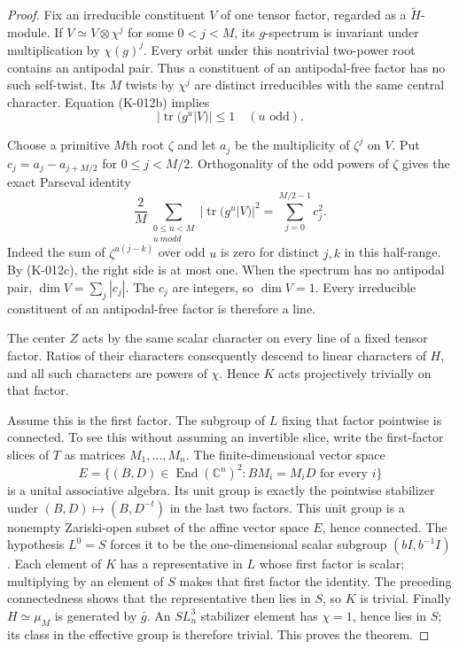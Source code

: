 \begin{proof}
Fix an irreducible constituent $V$ of one tensor factor, regarded as a
$\widetilde H$-module.  If $V\simeq V\otimes\chi^j$ for some
$0<j<M$, its $g$-spectrum is invariant under multiplication by
$\chi(g)^j$.  Every orbit under this nontrivial two-power root contains
an antipodal pair.  Thus a constituent of an antipodal-free factor has
no such self-twist.  Its $M$ twists by $\chi^j$ are distinct irreducibles
with the same central character.  Equation (K-012b) implies
\[
                         |\operatorname{tr}(g^u|V)|\le1
                         \quad(u\text{ odd}).               \tag{K-012c}
\]

Choose a primitive $M$th root $\zeta$ and let $a_j$ be the multiplicity
of $\zeta^j$ on $V$.  Put $c_j=a_j-a_{j+M/2}$ for $0\le j<M/2$.
Orthogonality of the odd powers of $\zeta$ gives the exact Parseval
identity
\[
 \frac{2}{M}\sum_{\substack{0\le u<M\\u\ {
m odd}}}
       |\operatorname{tr}(g^u|V)|^2
       =\sum_{j=0}^{M/2-1}c_j^2.                            \tag{K-012d}
\]
Indeed the sum of $\zeta^{u(j-k)}$ over odd $u$ is zero for distinct
$j,k$ in this half-range.  By (K-012c), the right side is at most one.
When the spectrum has no antipodal pair,
$\dim V=\sum_j|c_j|$.  The $c_j$ are integers, so $\dim V=1$.
Every irreducible constituent of an antipodal-free factor is therefore
a line.

The center $Z$ acts by the same scalar character on every line of a
fixed tensor factor.  Ratios of their characters consequently descend
to linear characters of $H$, and all such characters are powers of
$\chi$.  Hence $K$ acts projectively trivially on that factor.

Assume this is the first factor.  The subgroup of $L$ fixing that
factor pointwise is connected.  To see this without assuming an
invertible slice, write the first-factor slices of $T$ as matrices
$M_1,\ldots,M_n$.  The finite-dimensional vector space
\[
 E=\{(B,D)\in\operatorname{End}(\mathbb C^n)^2:
                       BM_i=M_iD\text{ for every }i\}
\]
is a unital associative algebra.  Its unit group is exactly the
pointwise stabilizer under $(B,D)\mapsto(B,D^{-t})$ in the last two
factors.  This unit group is a nonempty Zariski-open subset of the
affine vector space $E$, hence connected.  The hypothesis $L^0=S$
forces it to be the one-dimensional scalar subgroup
$(bI,b^{-1}I)$.  Each element of $K$ has a representative in $L$
whose first factor is scalar; multiplying by an element of $S$ makes
that first factor the identity.  The preceding connectedness shows
that the representative then lies in $S$, so $K$ is trivial.
Finally $H\simeq\mu_M$ is generated by $\bar g$.
An $SL_n^3$ stabilizer element has $\chi=1$, hence lies in $S$;
its class in the effective group is therefore trivial.  This proves
the theorem.
\end{proof}

